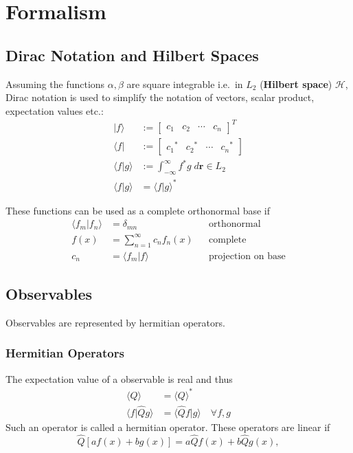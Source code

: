 \section{Formalism}

\subsection{Dirac Notation and Hilbert Spaces}
Assuming the functions $\alpha, \beta$ are square integrable i.e.\ in $L_2$ (\textbf{Hilbert space}) $\mathcal{H}$,
Dirac notation is used to simplify the notation of vectors, scalar product, expectation values etc.:
\noindent\begin{align*}
    |f\rangle           & := \begin{bmatrix}
                                 c_1 & c_2 & \cdots & c_n
                             \end{bmatrix}^T                             \\
    \langle f|          & := \begin{bmatrix}
                                 {c_1}^* & {c_2}^* & \cdots & {c_n}^*
                             \end{bmatrix}                 \\
    \langle f|g \rangle & := \int_{-\infty}^{\infty} f^* g\; d \mathbf{r} \in L_2 \\
    \langle f|g \rangle & = {\langle f|g \rangle}^*
\end{align*}

These functions can be used as a complete orthonormal base if
\noindent\begin{align*}
    \langle f_m|f_n \rangle & = \delta_{mn}                    &  & \text{orthonormal}        \\
    f(x)                    & = \sum_{n=1}^{\infty} c_n f_n(x) &  & \text{complete}           \\
    c_n                     & = \langle f_m|f \rangle          &  & \text{projection on base}
\end{align*}


\subsection{Observables}
Observables are represented by hermitian operators.
\subsubsection{Hermitian Operators}
The expectation value of a observable is real and thus
\noindent\begin{align*}
    \langle Q\rangle           & = {\langle Q\rangle}^*                       \\
    \langle f|\hat{Q} g\rangle & = \langle \hat{Q}f|g\rangle\quad \forall f,g
\end{align*}
Such an operator is called a hermitian operator. These operators are linear if
\noindent\begin{equation*}
    \hat{Q}\left[af(x)+bg(x)\right]=a\hat{Q}f(x)+b\hat{Q}g(x),
\end{equation*}

